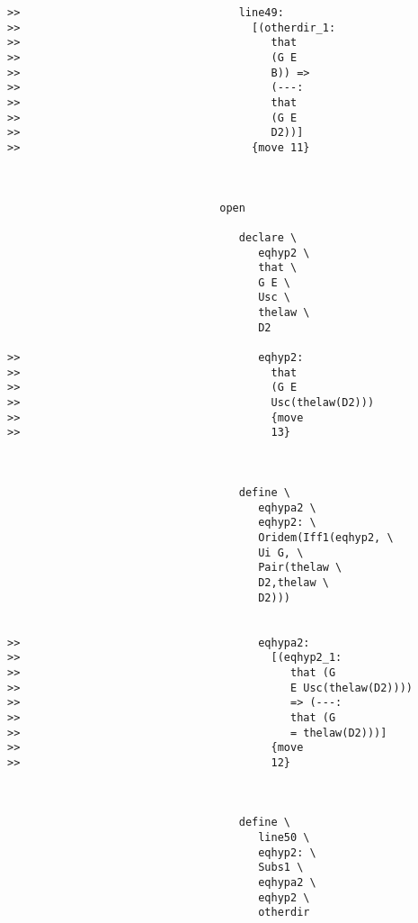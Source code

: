 \documentclass[12pt]{article}
\begin{document}
\begin{verbatim}
>>                                  line49:
>>                                    [(otherdir_1:
>>                                       that
>>                                       (G E
>>                                       B)) =>
>>                                       (---:
>>                                       that
>>                                       (G E
>>                                       D2))]
>>                                    {move 11}



                                 open

                                    declare \
                                       eqhyp2 \
                                       that \
                                       G E \
                                       Usc \
                                       thelaw \
                                       D2

>>                                     eqhyp2:
>>                                       that
>>                                       (G E
>>                                       Usc(thelaw(D2)))
>>                                       {move
>>                                       13}



                                    define \
                                       eqhypa2 \
                                       eqhyp2: \
                                       Oridem(Iff1(eqhyp2, \
                                       Ui G, \
                                       Pair(thelaw \
                                       D2,thelaw \
                                       D2)))


>>                                     eqhypa2:
>>                                       [(eqhyp2_1:
>>                                          that (G
>>                                          E Usc(thelaw(D2))))
>>                                          => (---:
>>                                          that (G
>>                                          = thelaw(D2)))]
>>                                       {move
>>                                       12}



                                    define \
                                       line50 \
                                       eqhyp2: \
                                       Subs1 \
                                       eqhypa2 \
                                       eqhyp2 \
                                       otherdir



\end{verbatim}
\end{document}

